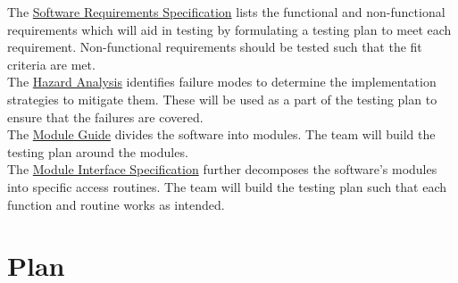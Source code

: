 \documentclass[12pt, titlepage]{article}
\begin{document}

\noindent The \href{https://github.com/stanreee/sign-language-learning/blob/main/docs/SRS/SRS.pdf}{Software Requirements Specification} lists the functional and non-functional requirements which will aid in testing by formulating a testing plan to meet each requirement. Non-functional requirements should be tested such that the fit criteria are met.\\


\noindent The \href{https://github.com/stanreee/sign-language-learning/blob/main/docs/HazardAnalysis/HazardAnalysis.pdf}{Hazard Analysis} identifies failure modes to determine the implementation strategies to mitigate them. These will be used as a part of the testing plan to ensure that the failures are covered.\\


\noindent The \href{https://github.com/stanreee/sign-language-learning/blob/main/docs/Design/SoftArchitecture/MG.pdf}{Module Guide} divides the software into modules. The team will build the testing plan around the modules.\\


\noindent The \href{https://github.com/stanreee/sign-language-learning/blob/main/docs/Design/SoftDetailedDes/MIS.pdf}{Module Interface Specification} further decomposes the software's modules into specific access routines. The team will build the testing plan such that each function and routine works as intended.

\section{Plan}
\end{document}
